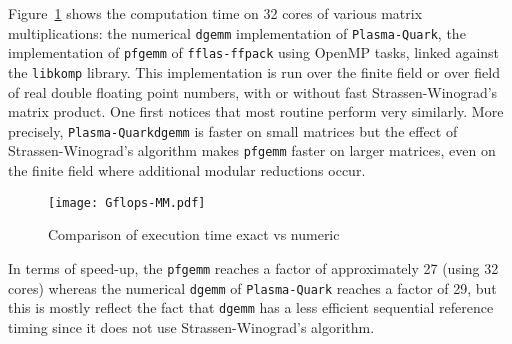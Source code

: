 \documentclass{article}
\newcommand{\pfgemm}{\texttt{pfgemm}\xspace}
\newcommand{\dgemm}{\texttt{dgemm}\xspace}
\newcommand{\libkomp}{\texttt{libkomp}\xspace}
\newcommand{\fflasffpack}{\texttt{fflas-ffpack}\xspace}
\newcommand{\plasmaquark}{\texttt{Plasma-Quark}\xspace}
\begin{document}
    
 
 
 
 
 
 
 
 
 
 
 
 
 
 
 
 
 

Figure~\ref{fig:pfgemmtime} shows the computation time on 32 cores of various
matrix multiplications: the numerical \dgemm implementation of \plasmaquark, 
the implementation of \pfgemm of \fflasffpack using OpenMP tasks, linked
against the \libkomp library. This implementation is run over the finite field
 or over field of real double floating point numbers, with or
without fast Strassen-Winograd's matrix product. 
One first notices that most routine perform very similarly. More precisely,
\plasmaquark \dgemm is faster on small matrices but the effect of
Strassen-Winograd's algorithm makes \pfgemm faster on larger matrices, even
on the finite field where additional modular reductions occur.
 
 
 
 
 
 
 
  
 
 
 
 
 
 
 
 
 
 
 
 
 
 
\begin{figure}[ht!]
\centering
 
\texttt{[image: Gflops-MM.pdf]}\\
 
 
 
 
\caption{Comparison of execution time exact vs numeric}
\label{fig:pfgemmtime}\vspace{-5pt}
\end{figure}
 
 
 
 
 
 
 
 
 
 
 
 
 
In terms of speed-up, the \pfgemm reaches a factor of approximately 27 (using
32 cores) whereas the numerical \dgemm of \plasmaquark reaches a factor of 29,
but this is mostly reflect the fact that \dgemm has a less efficient sequential
reference timing since it does not use Strassen-Winograd's algorithm.
 
\end{document}
